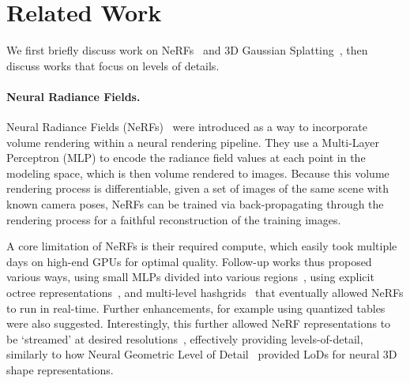 
\section{Related Work}

  We first briefly discuss work on NeRFs~\cite{mildenhall2020nerf} and 3D
  Gaussian Splatting~\cite{kerbl20233d}, then discuss works that focus on
  levels of details.

  \paragraph{Neural Radiance Fields.}
    Neural Radiance Fields (NeRFs)~\cite{mildenhall2020nerf} were introduced
    as a way to incorporate volume rendering within a neural rendering
    pipeline.
    They use a Multi-Layer Perceptron (MLP) to encode the radiance field
    values at each point in the modeling space, which is then volume rendered
    to images.
    Because this volume rendering process is differentiable, given a set of
    images of the same scene with known camera poses, NeRFs can be trained via
    back-propagating through the rendering process for a faithful
    reconstruction of the training images.

    A core limitation of NeRFs is their required compute, which easily took
    multiple days on high-end GPUs for optimal quality.
    Follow-up works thus proposed various ways, using small MLPs divided into
    various regions~\cite{garbin2021fastnerf}, using explicit octree
    representations~\cite{yu2021plenoctrees,fridovich2022plenoxels}, and
    multi-level hashgrids~\cite{mueller2022instant} that eventually allowed
    NeRFs to run in real-time.
    Further enhancements, for example using quantized
    tables~\cite{takikawa2022variable} were also suggested.
    Interestingly, this further allowed NeRF representations to be `streamed'
    at desired resolutions~\cite{reiser2023merf,duckworth2024smerf},
    effectively providing levels-of-detail, similarly to how Neural Geometric
    Level of Detail~\cite{takikawa2021neural} provided LoDs for neural 3D
    shape representations.

